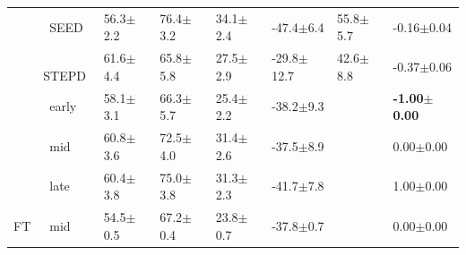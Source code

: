 \begin{tabular}{llllllll}
 & $\ \;$SEED & 56.3\tiny{$\pm$2.2} & 76.4\tiny{$\pm$3.2} & 34.1\tiny{$\pm$2.4} & -47.4\tiny{$\pm$6.4} & 55.8\tiny{$\pm$5.7} & -0.16\tiny{$\pm$0.04} \\
 & $\ \;$STEPD & 61.6\tiny{$\pm$4.4} & 65.8\tiny{$\pm$5.8} & 27.5\tiny{$\pm$2.9} & -29.8\tiny{$\pm$12.7} & 42.6\tiny{$\pm$8.8} & -0.37\tiny{$\pm$0.06} \\
 & $\ \;$early & 58.1\tiny{$\pm$3.1} & 66.3\tiny{$\pm$5.7} & 25.4\tiny{$\pm$2.2} & -38.2\tiny{$\pm$9.3} &  & \textbf{-1.00\tiny{$\pm$0.00}} \\
 & $\ \;$mid & 60.8\tiny{$\pm$3.6} & 72.5\tiny{$\pm$4.0} & 31.4\tiny{$\pm$2.6} & -37.5\tiny{$\pm$8.9} &  & 0.00\tiny{$\pm$0.00} \\
 & $\ \;$late & 60.4\tiny{$\pm$3.8} & 75.0\tiny{$\pm$3.8} & 31.3\tiny{$\pm$2.3} & -41.7\tiny{$\pm$7.8} &  & 1.00\tiny{$\pm$0.00} \\
\midrule
FT & $\ \;$mid & 54.5\tiny{$\pm$0.5} & 67.2\tiny{$\pm$0.4} & 23.8\tiny{$\pm$0.7} & -37.8\tiny{$\pm$0.7} &  & 0.00\tiny{$\pm$0.00} \\
\bottomrule
\end{tabular}

